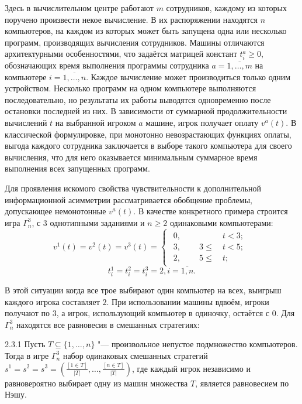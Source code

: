 Здесь в вычислительном центре работают $m$ сотрудников, каждому из которых поручено произвести некое вычисление. В их распоряжении находятся $n$ компьютеров, на каждом из которых может быть запущена одна или несколько программ, производящих вычисления сотрудников. Машины отличаются архитектурными особенностями, что задаётся матрицей констант $t_i^a \ge 0$, обозначающих время выполнения программы сотрудника $a=\overline{1,\ldots,m}$ на компьютере $i=\overline{1,\ldots,n}$. Каждое вычисление может производиться только одним устройством. Несколько программ на одном компьютере выполняются последовательно, но результаты их работы выводятся одновременно после остановки последней из них. В зависимости от суммарной продолжительности вычислений $t$ на выбранной игроком $a$ машине, игрок получает оплату $v^a(t)$. В классической формулировке, при монотонно невозрастающих функциях оплаты, выгода каждого сотрудника заключается в выборе такого компьютера для своего вычисления, что для него оказывается минимальным суммарное время выполнения всех запущенных программ.

Для проявления искомого свойства чувствительности к дополнительной информационной асимметрии рассматривается обобщение проблемы, допускающее немонотонные $v^a(t)$. В качестве конкретного примера строится игра $\Gamma^3_n$, с $3$ однотипными заданиями и $n \ge 2$ одинаковыми компьютерами:
\begin{equation*}
	v^1(t) = v^2(t) = v^3(t) = \begin{cases}
		\begin{aligned}
			0, \qquad\qquad & \ t < 3 ;\\
			3, \qquad\ 3 \le & \ t < 5 ;\\
			2, \qquad\ 5 \le & \ t ;
		\end{aligned}
	\end{cases}
\end{equation*}
\begin{equation*}
	t_i^1 = t_i^2 = t_i^3 = 2, i = \overline{1,n}.
\end{equation*}

В этой ситуации когда все трое выбирают один компьютер на всех, выигрыш каждого игрока составляет $2$. При использовании машины вдвоём, игроки получают по $3$, а игрок, использующий компьютер в одиночку, остаётся с $0$. Для $\Gamma^3_n$ находятся все равновесия в смешанных стратегиях:
\begin{lemma}{2.3.1}
	Пусть $T \subseteq \{1, \ldots, n\}$ "--- произвольное непустое подмножество компьютеров. Тогда в игре $\Gamma^3_n$ набор одинаковых смешанных стратегий $s^1 = s^2 = s^3 = \left(\frac{[1 \in T]}{\left| T \right|}, \ldots, \frac{[n \in T]}{\left| T \right|}\right)$, где каждый игрок независимо и равновероятно выбирает одну из машин множества $T$, является равновесием по Нэшу.
\end{lemma}

